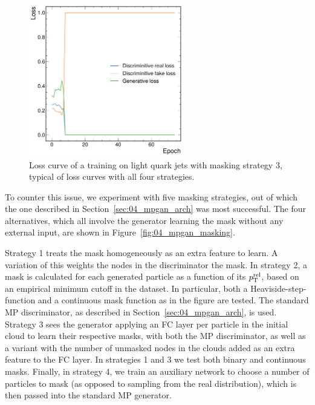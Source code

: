 \begin{figure}[htpb]
    \centering
    \centerline{\includegraphics[width=0.6\textwidth]{figures/04-ML4Sim/mpgan/masking/masking_loss.pdf}}
    \caption{Loss curve of a training on light quark jets with masking strategy 3, typical of loss curves with all four strategies.
    }
    \label{fig:04_mpgan_masking_loss}
\end{figure}

To counter this issue, we experiment with five masking strategies, out of which the one described in Section~\ref{sec:04_mpgan_arch} was most successful. 
The four alternatives, which all involve the generator learning the mask without any external input, are shown in Figure~\ref{fig:04_mpgan_masking}.

Strategy 1 treats the mask homogeneously as an extra feature to learn. 
A variation of this weights the nodes in the discriminator the mask. 
In strategy 2, a mask is calculated for each generated particle as a function of its $p_\mathrm{T}^\mathrm{rel}$, based on an empirical minimum cutoff in the dataset. 
In particular, both a Heaviside-step-function and a continuous mask function as in the figure are tested. 
The standard MP discriminator, as described in Section~\ref{sec:04_mpgan_arch}, is used. 
Strategy 3 sees the generator applying an FC layer per particle in the initial cloud to learn their respective masks, with both the MP discriminator, as well as a variant with the number of unmasked nodes in the clouds added as an extra feature to the FC layer. 
In strategies 1 and 3 we test
both binary and continuous masks.
Finally, in strategy 4, we train an auxiliary network to choose a number of particles to mask (as opposed to sampling from the real distribution), which is then passed into the standard MP generator.

